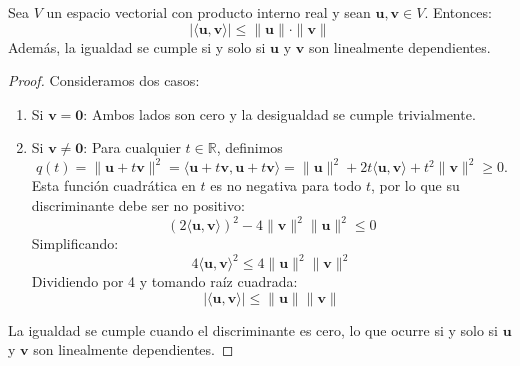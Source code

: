 \begin{theorem}\label{thm:cap07:cauchy-schwarz}
Sea $V$ un espacio vectorial con producto interno real y sean $\mathbf{u}, \mathbf{v} \in V$. Entonces:
\[
|\langle \mathbf{u}, \mathbf{v} \rangle| \leq \|\mathbf{u}\| \cdot \|\mathbf{v}\|
\]
Además, la igualdad se cumple si y solo si $\mathbf{u}$ y $\mathbf{v}$ son linealmente dependientes.
\begin{proof}
Consideramos dos casos:
\begin{enumerate}
    \item Si $\mathbf{v} = \mathbf{0}$: Ambos lados son cero y la desigualdad se cumple trivialmente.
    
    \item Si $\mathbf{v} \neq \mathbf{0}$: Para cualquier $t \in \mathbb{R}$, definimos \[q(t) = \|\mathbf{u} + t\mathbf{v}\|^2 = \langle \mathbf{u} + t\mathbf{v}, \mathbf{u} + t\mathbf{v} \rangle = \|\mathbf{u}\|^2 + 2t\langle \mathbf{u}, \mathbf{v} \rangle + t^2\|\mathbf{v}\|^2 \geq 0.\]
    Esta función cuadrática en $t$ es no negativa para todo $t$, por lo que su discriminante debe ser no positivo:
    \[
    (2\langle \mathbf{u}, \mathbf{v} \rangle)^2 - 4\|\mathbf{v}\|^2\|\mathbf{u}\|^2 \leq 0
    \]
    Simplificando:
    \[
    4\langle \mathbf{u}, \mathbf{v} \rangle^2 \leq 4\|\mathbf{u}\|^2\|\mathbf{v}\|^2
    \]
    Dividiendo por 4 y tomando raíz cuadrada:
    \[
    |\langle \mathbf{u}, \mathbf{v} \rangle| \leq \|\mathbf{u}\|\|\mathbf{v}\|
    \]
\end{enumerate}
La igualdad se cumple cuando el discriminante es cero, lo que ocurre si y solo si $\mathbf{u}$ y $\mathbf{v}$ son linealmente dependientes.
\end{proof}
\end{theorem}

